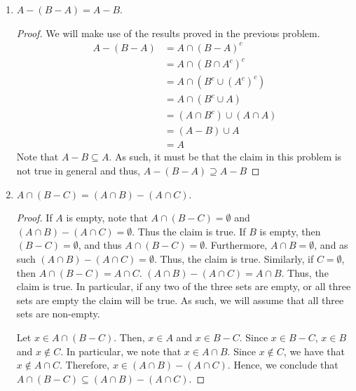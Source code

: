 \documentclass[12pt]{article}
\begin{document}
\begin{enumerate}[label=(\alph*)]
\begin{proof}
		With these three results we can now prove our original claim.
		\begin{align*}
			A - (A - B) &= A \cap (A - B)^{c} \\
						&= A \cap (A^{c} \cup (B^{c})^{c}) \\ 
						&= A \cap (A^{c} \cup B) \\
						&= (A \cap A^{c}) \cup (A \cap B) \\
						&= A \cap B		
		\end{align*}
		Hence, $A - (A - B) = A \cap B$. In particular, it implies that $A - (A - B) \subset B$.
	\end{proof}
	\item $A - (B - A) = A - B$.
	\begin{proof}
		We will make use of the results proved in the previous problem.
		\begin{align*}
			A - (B - A) &= A \cap (B - A)^c \\
						&= A \cap (B \cap A^c)^c \\
						&= A \cap (B^c \cup (A^c)^c) \\
						&= A \cap (B^c \cup A) \\
						&= (A \cap B^c) \cup (A \cap A) \\
						&= (A - B) \cup A \\
						&= A
		\end{align*}
		Note that $A - B \subseteq A$. As such, it must be that the claim in this problem
		is not true in general and thus, $A - (B - A) \supseteq A - B$
	\end{proof}
	\item  $A \cap (B - C) = (A \cap B) - (A \cap C)$.
	\begin{proof}
		If $A$ is empty, note that $A \cap (B - C) = \emptyset$ and $(A \cap B) - (A \cap C) = 
		\emptyset$. Thus the claim is true. If $B$ is empty, then $(B - C) = \emptyset$,
		and thus $A \cap (B - C) = \emptyset$. Furthermore, $A \cap B = \emptyset$, and as 
		such $(A \cap B) - (A \cap C) = \emptyset$. Thus, the claim is true. Similarly,
		if $C = \emptyset$, then $A \cap (B - C) = A \cap C$. $(A \cap B) - (A \cap C) = 
		A \cap B$. Thus, the claim is true. In particular, if any two of the three
		sets are empty, or all three sets are empty the claim will be true. As such, we 
		will assume that all three sets are non-empty. 
		
		Let $x \in A \cap (B - C)$. Then, $x \in A$ and $x \in B - C$. Since $x \in B - C$,
		$x \in B$ and $x \notin C$. In particular, we note that $x \in A \cap B$.
		Since $x \notin C$, we have that $x \notin A \cap C$. Therefore, 
		$x \in (A \cap B) - (A \cap C)$. Hence, we conclude that 
		$A \cap (B - C) \subseteq (A \cap B) - (A \cap C)$.
		

\end{proof}
\end{enumerate}
\end{document}
